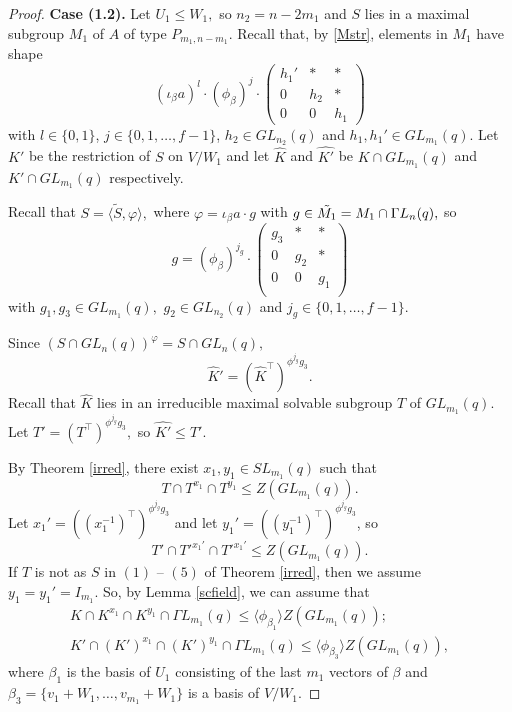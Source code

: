 \begin{proof}
\medskip

{\bf Case (1.2).} Let $U_1 \le W_1,$ so $n_2=n-2m_1$ and $S$ lies in a maximal subgroup $M_1$ of $A$ of type $P_{m_1, n-m_1}.$ Recall that, by \eqref{Mstr}, elements in $M_1$ have shape 
\begin{equation}
\label{GRPmnmdiag}
(\iota_{\beta} a)^l \cdot (\phi_{\beta})^j \cdot 
\begin{pmatrix}
h_1' & * & *\\
 0   & h_2 & *\\
 0   & 0 & h_1
\end{pmatrix}
\end{equation}
with $l \in \{0,1\}$, $j \in \{0, 1, \ldots, f-1\}$, $h_2 \in GL_{n_2}(q)$ and $h_1, h_1' \in GL_{m_1}(q).$ Let $K'$ be the restriction of $S$ on $V/W_1$ and let $\hat{K}$ and $\hat{K'}$ be $K \cap GL_{m_1}(q)$ and $K' \cap GL_{m_1}(q)$ respectively.

 Recall that $S=\langle \tilde{S}, \varphi \rangle,$ where $\varphi = \iota_{\beta} a \cdot g$ with $g \in \tilde{M_1}=M_1 \cap {{\Gamma L}}_n(q),$ so 
$$g= (\phi_{\beta})^{j_g} \cdot 
\begin{pmatrix}
g_3 & * & * \\
0  & g_2 & *\\
0 & 0 & g_1 \\
\end{pmatrix}
$$ with $g_1, g_3 \in GL_{m_1}(q),$ $g_2 \in GL_{n_2}(q)$ and $j_g \in \{0,1, \ldots, f-1\}.$ 

Since $(S \cap GL_n(q))^{\varphi}=S \cap GL_n(q),$  $$\hat{K}'=(\hat{K}^{\top})^{\phi^{j_g} g_3}.$$ Recall that $\hat{K}$ lies in an irreducible maximal solvable subgroup $T$ of $GL_{m_1}(q).$  Let $T'=(T^{\top})^{\phi^{j_g} g_3},$ so $\hat{K'}\le T'.$ 

By Theorem \ref{irred}, there exist $x_1, y_1 \in SL_{m_1}(q)$ such that $$T \cap T^{x_1} \cap T^{y_1}\le Z(GL_{m_1}(q)).$$ Let $x_1'= ((x_1^{-1})^{\top})^{\phi^{j_g} g_3}$ and let $y_1'= ((y_1^{-1})^{\top})^{\phi^{j_g} g_3}$,  so $$T' \cap T'^{x_1'} \cap T'^{x_1'} \le Z(GL_{m_1}(q)).$$  If $T$ is not as $S$ in  $(1)$ -- $(5)$ of Theorem \ref{irred}, then we assume $y_1=y_1'=I_{m_1}.$ So, by Lemma \ref{scfield}, we can assume that 
\begin{align*}
K \cap K^{x_1} \cap K^{y_1} \cap \Gamma L_{m_1}(q) \le \langle \phi_{\beta_1} \rangle Z(GL_{m_1}(q));\\
K' \cap (K')^{x_1} \cap (K')^{y_1} \cap \Gamma L_{m_1}(q) \le \langle \phi_{\beta_3} \rangle Z(GL_{m_1}(q)),
\end{align*}
 where $\beta_1$ is the basis of $U_1$ consisting of the last $m_1$ vectors of $\beta$ and $\beta_{3}=\{v_1 +W_1, \ldots, v_{m_1} + W_1\}$ is a basis of $V/W_1.$



\end{proof}
